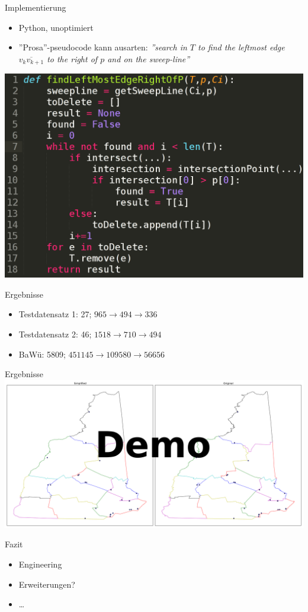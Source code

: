 \documentclass[14pt]{beamer}
\begin{document}
\begin{frame}{Implementierung}
\begin{itemize}
	\item Python, unoptimiert
	\item ''Prosa''-pseudocode kann ausarten: \emph{''search in $T$ to find the leftmost edge $\overline{v_kv_{k+1}}$ to the right of $p$ and on the
sweep-line''}
\end{itemize}

\includegraphics[width=.8\textwidth,center]{img/implvspseudo.png}
\end{frame}

\begin{frame}{Ergebnisse}
\begin{itemize}
	\item Testdatensatz 1: 27; $965 \rightarrow 494 \rightarrow 336$
	\item Testdatensatz 2: 46; $1518 \rightarrow 710 \rightarrow 494$
	\item BaWü: 5809; $451145 \rightarrow 109580 \rightarrow 56656$
\end{itemize}
\end{frame}

\begin{frame}{Ergebnisse}
\includegraphics[width=1.25\textwidth,center]{img/result_dataset1.pdf}
\end{frame}

\begin{frame}{Fazit}
  \begin{itemize}
	\item Engineering
	\item Erweiterungen?
	\item \dots
\end{itemize}
\end{frame}
\end{document}
